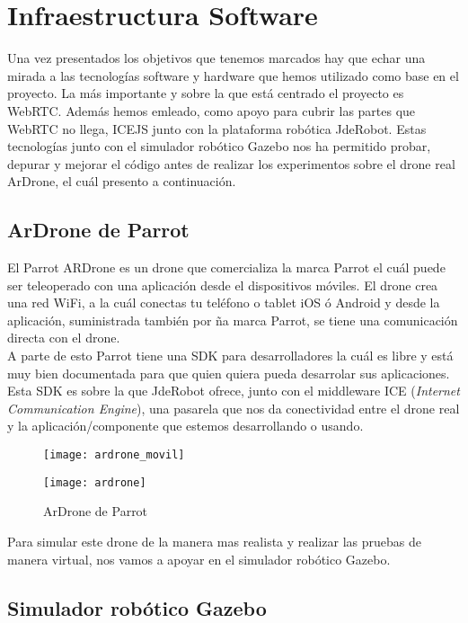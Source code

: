 \chapter{Infraestructura Software} 

Una vez presentados los objetivos que tenemos marcados hay que echar una mirada a las tecnologías software y hardware que hemos utilizado como base en el proyecto. La más importante y sobre la que está centrado el proyecto es WebRTC. Además hemos emleado, como apoyo para cubrir las partes que WebRTC no llega, ICEJS junto con la plataforma robótica JdeRobot. Estas tecnologías junto con el simulador robótico Gazebo nos ha permitido probar, depurar y mejorar el código antes de realizar los experimentos sobre el drone real ArDrone, el cuál presento a continuación.


\section{ArDrone de Parrot}

El Parrot ARDrone es un drone que comercializa la marca Parrot el cuál puede ser teleoperado con una aplicación desde el dispositivos móviles. El drone crea una red WiFi, a la cuál conectas tu teléfono o tablet iOS ó Android y desde la aplicación, suministrada también por ña marca Parrot,  se tiene una comunicación directa con el drone.\\

A parte de esto Parrot tiene una SDK para desarrolladores la cuál es libre y está muy bien documentada para que quien quiera pueda desarrolar sus aplicaciones. Esta SDK es sobre la que JdeRobot ofrece, junto con el middleware ICE (\emph{Internet Communication Engine}), una pasarela que nos da conectividad entre el drone real y la aplicación/componente que estemos desarrollando o usando.

\begin{figure}[h!]
\centering
\texttt{[image: ardrone\_movil]}
\end{figure}

\begin{figure}[h!]
\centering
\texttt{[image: ardrone]}
\caption{ArDrone de Parrot}
\label{fig:ardrone}
\end{figure}

Para simular este drone de la manera mas realista y realizar las pruebas de manera virtual, nos vamos a apoyar en el simulador robótico Gazebo.


\newpage
\section{Simulador robótico Gazebo}

